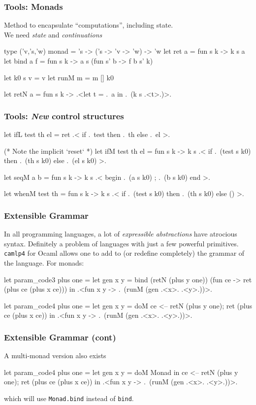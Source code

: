\documentclass{beamer}
\begin{document}
\begin{frame}[fragile]
    \frametitle{Tools: Monads}
    Method to encapsulate ``computations'', including state.\\
    We need \emph{state} and \emph{continuations}
\begin{code}
type ('v,'s,'w) monad = 's -> ('s -> 'v -> 'w) -> 'w
let ret a = fun s k -> k s a
let bind a f = fun s k -> a s (fun s' b -> f b s' k)

let k0 s v = v
let runM m = m [] k0

let retN a = fun s k -> .<let t = .~a in .~(k s .<t>.)>.
\end{code}
\end{frame}

\begin{frame}[fragile]
    \frametitle{Tools: \textit{New} control structures}
\begin{code}
let ifL test th el = ret .< if .~test then .~th else .~el >.

(* Note the implicit `reset` *)
let ifM test th el = fun s k -> k s
  .< if .~(test s k0) then .~(th s k0) else .~(el s k0) >.

let seqM a b = fun s k -> k s 
  .< begin .~(a s k0) ; .~(b s k0) end >.

let whenM test th  = fun s k -> k s 
  .< if .~(test s k0) then .~(th s k0) else () >.
\end{code}
\end{frame}

\begin{frame}[fragile]
    \frametitle{Extensible Grammar}
    In all programming languages, a lot of \emph{expressible abstractions}
    have atrocious syntax.  Definitely a problem of languages with
    just a few powerful primitives. \texttt{camlp4} for Ocaml allows one to add
    to (or redefine completely) the grammar of the language.  For monads:
\begin{code}
let param_code3 plus one =
  let gen x y = bind (retN (plus y one)) (fun ce -> 
                ret (plus ce (plus x ce)))
  in .<fun x y -> .~(runM (gen .<x>. .<y>.))>.

let param_code4 plus one =
  let gen x y = doM ce <-- retN (plus y one);
                    ret (plus ce (plus x ce))
  in .<fun x y -> .~(runM (gen .<x>. .<y>.))>.
\end{code}
\end{frame}

\begin{frame}[fragile]
    \frametitle{Extensible Grammar (cont) }
A multi-monad version also exists
\begin{code}
let param_code4 plus one =
  let gen x y = doM Monad in
                    ce <-- retN (plus y one);
                    ret (plus ce (plus x ce))
  in .<fun x y -> .~(runM (gen .<x>. .<y>.))>.
\end{code}
which will use \verb+Monad.bind+ instead of \verb+bind+.
\end{frame}
\end{document}
